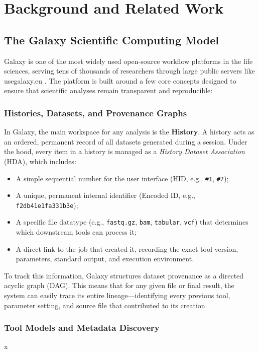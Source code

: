 \chapter{Background and Related Work}
\label{chap:background}

\section{The Galaxy Scientific Computing Model}
\label{sec:galaxy_model}

Galaxy is one of the most widely used open-source workflow platforms in the life sciences, serving tens of thousands of researchers through large public servers like usegalaxy.eu \cite{goecks2010galaxy}. The platform is built around a few core concepts designed to ensure that scientific analyses remain transparent and reproducible:

\subsection{Histories, Datasets, and Provenance Graphs}
In Galaxy, the main workspace for any analysis is the \textbf{History}. A history acts as an ordered, permanent record of all datasets generated during a session. Under the hood, every item in a history is managed as a \textit{History Dataset Association} (HDA), which includes:
\begin{itemize}
    \item A simple sequential number for the user interface (HID, e.g., \texttt{\#1}, \texttt{\#2});
    \item A unique, permanent internal identifier (Encoded ID, e.g., \texttt{f2db41e1fa331b3e});
    \item A specific file datatype (e.g., \texttt{fastq.gz}, \texttt{bam}, \texttt{tabular}, \texttt{vcf}) that determines which downstream tools can process it;
    \item A direct link to the job that created it, recording the exact tool version, parameters, standard output, and execution environment.
\end{itemize}

To track this information, Galaxy structures dataset provenance as a directed acyclic graph (DAG). This means that for any given file or final result, the system can easily trace its entire lineage—identifying every previous tool, parameter setting, and source file that contributed to its creation.
\subsection{Tool Models and Metadata Discovery}
x

